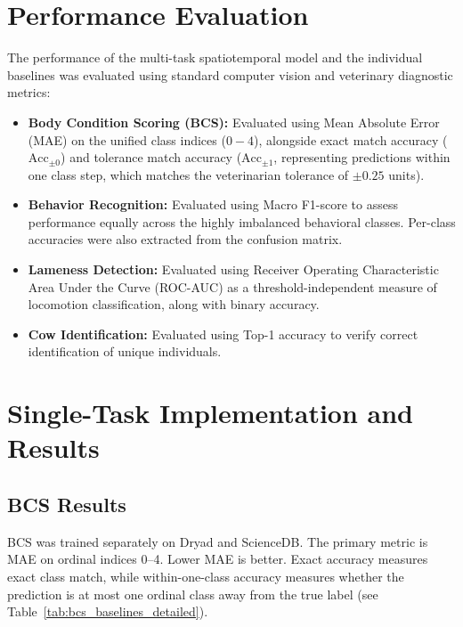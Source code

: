 \section{Performance Evaluation}
The performance of the multi-task spatiotemporal model and the individual baselines was evaluated using standard computer vision and veterinary diagnostic metrics:
\begin{itemize}
    \item \textbf{Body Condition Scoring (BCS):} Evaluated using Mean Absolute Error (MAE) on the unified class indices ($0-4$), alongside exact match accuracy ($\text{Acc}_{\pm 0}$) and tolerance match accuracy ($\text{Acc}_{\pm 1}$, representing predictions within one class step, which matches the veterinarian tolerance of $\pm 0.25$ units).
    \item \textbf{Behavior Recognition:} Evaluated using Macro F1-score to assess performance equally across the highly imbalanced behavioral classes. Per-class accuracies were also extracted from the confusion matrix.
    \item \textbf{Lameness Detection:} Evaluated using Receiver Operating Characteristic Area Under the Curve (ROC-AUC) as a threshold-independent measure of locomotion classification, along with binary accuracy.
    \item \textbf{Cow Identification:} Evaluated using Top-1 accuracy to verify correct identification of unique individuals.
\end{itemize}

\section{Single-Task Implementation and Results}

\subsection{BCS Results}
BCS was trained separately on Dryad and ScienceDB. The primary metric is MAE on ordinal indices 0--4. Lower MAE is better. Exact accuracy measures exact class match, while within-one-class accuracy measures whether the prediction is at most one ordinal class away from the true label (see Table~\ref{tab:bcs_baselines_detailed}).

